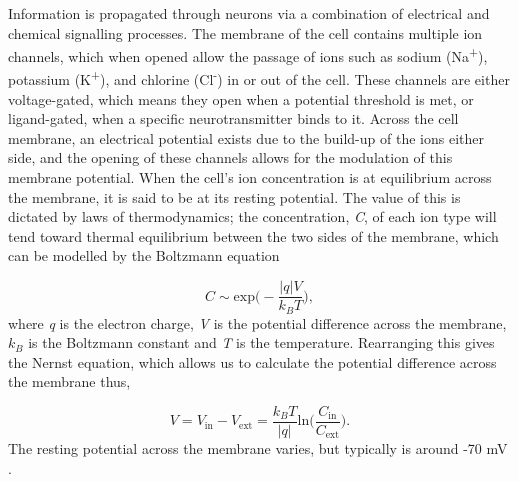 Information is propagated through neurons via a combination of electrical and chemical signalling processes. The membrane of the cell contains multiple ion channels, which when opened allow the passage of ions such as sodium (Na\textsuperscript{+}), potassium (K\textsuperscript{+}), and chlorine (Cl\textsuperscript{-}) in or out of the cell. These channels are either voltage-gated, which means they open when a potential threshold is met, or ligand-gated, when a specific neurotransmitter binds to it. Across the cell membrane, an electrical potential exists due to the build-up of the ions either side, and the opening of these channels allows for the modulation of this membrane potential. When the cell's ion concentration is at equilibrium across the membrane, it is said to be at its resting potential. The value of this is dictated by laws of thermodynamics; the concentration, \textit{C}, of each ion type will tend toward thermal equilibrium between the two sides of the membrane, which can be modelled by the Boltzmann equation

\begin{equation}
C \sim \text{exp}\Bigg(-\frac{|q|V}{k_BT}\Bigg),
\end{equation} where \textit{q} is the electron charge, \textit{V} is the potential difference across the membrane, $k_B$ is the Boltzmann constant and \textit{T} is the temperature. Rearranging this gives the Nernst equation, which allows us to calculate the potential difference across the membrane thus,

\begin{equation}
V = V_{\text{in}}-V_{\text{ext}}=\frac{k_B T}{|q|}\text{ln}\Bigg(\frac{C_{\text{in}}}{C_{\text{ext}}}\Bigg).
\end{equation} The resting potential across the membrane varies, but typically is around -70 mV \citep{Goldman1943}. 

